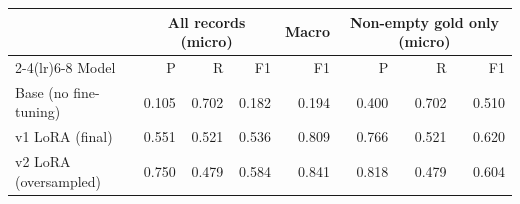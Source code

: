 \begin{tabular}{lrrrrrrr}\toprule
 & \multicolumn{3}{c}{All records (micro)} & Macro & \multicolumn{3}{c}{Non-empty gold only (micro)} \\
\cmidrule(lr){2-4}\cmidrule(lr){6-8}
Model & P & R & F1 & F1 & P & R & F1 \\ \midrule
Base (no fine-tuning) & 0.105 & 0.702 & 0.182 & 0.194 & 0.400 & 0.702 & 0.510 \\
v1 LoRA (final) & 0.551 & 0.521 & 0.536 & 0.809 & 0.766 & 0.521 & 0.620 \\
v2 LoRA (oversampled) & 0.750 & 0.479 & 0.584 & 0.841 & 0.818 & 0.479 & 0.604 \\
\bottomrule\end{tabular}